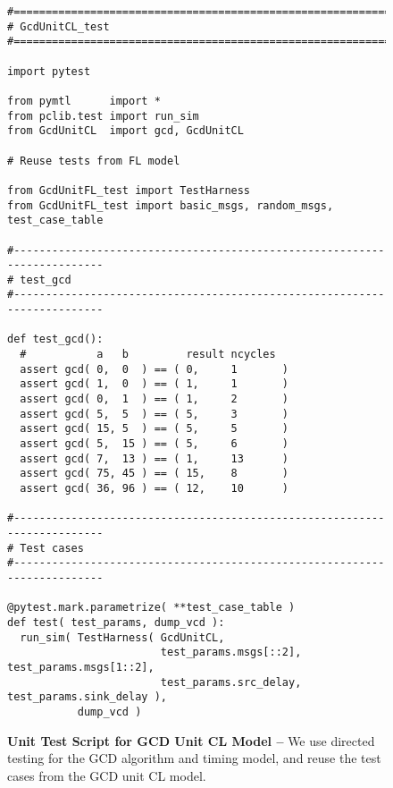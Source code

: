 
\begin{figure}

  \begin{lstlisting}[xleftmargin={0.9in}]
#=========================================================================
# GcdUnitCL_test
#=========================================================================

import pytest

from pymtl      import *
from pclib.test import run_sim
from GcdUnitCL  import gcd, GcdUnitCL

# Reuse tests from FL model

from GcdUnitFL_test import TestHarness
from GcdUnitFL_test import basic_msgs, random_msgs, test_case_table

#-------------------------------------------------------------------------
# test_gcd
#-------------------------------------------------------------------------

def test_gcd():
  #           a   b         result ncycles
  assert gcd( 0,  0  ) == ( 0,     1       )
  assert gcd( 1,  0  ) == ( 1,     1       )
  assert gcd( 0,  1  ) == ( 1,     2       )
  assert gcd( 5,  5  ) == ( 5,     3       )
  assert gcd( 15, 5  ) == ( 5,     5       )
  assert gcd( 5,  15 ) == ( 5,     6       )
  assert gcd( 7,  13 ) == ( 1,     13      )
  assert gcd( 75, 45 ) == ( 15,    8       )
  assert gcd( 36, 96 ) == ( 12,    10      )

#-------------------------------------------------------------------------
# Test cases
#-------------------------------------------------------------------------

@pytest.mark.parametrize( **test_case_table )
def test( test_params, dump_vcd ):
  run_sim( TestHarness( GcdUnitCL,
                        test_params.msgs[::2], test_params.msgs[1::2],
                        test_params.src_delay, test_params.sink_delay ),
           dump_vcd )
\end{lstlisting}

  \caption{\textbf{Unit Test Script for GCD Unit CL Model --} We use
    directed testing for the GCD algorithm and timing model, and reuse
    the test cases from the GCD unit CL model.}
  \label{code-tut3-gcd-cl-test}

\end{figure}

